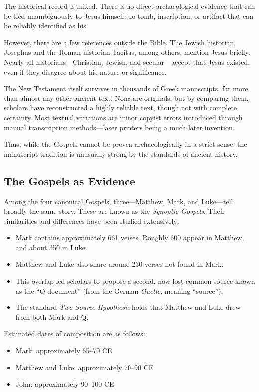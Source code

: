 The historical record is mixed. There is no direct archaeological evidence that can be tied unambiguously to Jesus himself: no tomb, inscription, or artifact that can be reliably identified as his.

However, there are a few references outside the Bible. The Jewish historian Josephus and the Roman historian Tacitus, among others, mention Jesus briefly. Nearly all historians—Christian, Jewish, and secular—accept that Jesus existed, even if they disagree about his nature or significance.

The New Testament itself survives in thousands of Greek manuscripts, far more than almost any other ancient text. None are originals, but by comparing them, scholars have reconstructed a highly reliable text, though not with complete certainty. Most textual variations are minor copyist errors introduced through manual transcription methods—laser printers being a much later invention.

Thus, while the Gospels cannot be proven archaeologically in a strict sense, the manuscript tradition is unusually strong by the standards of ancient history.

\subsection*{The Gospels as Evidence}

Among the four canonical Gospels, three—Matthew, Mark, and Luke—tell broadly the same story. These are known as the \emph{Synoptic Gospels}. Their similarities and differences have been studied extensively:

\begin{itemize}
  \item Mark contains approximately 661 verses. Roughly 600 appear in Matthew, and about 350 in Luke.
  \item Matthew and Luke also share around 230 verses not found in Mark.
  \item This overlap led scholars to propose a second, now-lost common source known as the ``Q document'' (from the German \emph{Quelle}, meaning ``source'').
  \item The standard \emph{Two-Source Hypothesis} holds that Matthew and Luke drew from both Mark and Q.
\end{itemize}

Estimated dates of composition are as follows:
\begin{itemize}
  \item Mark: approximately 65--70 CE
  \item Matthew and Luke: approximately 70--90 CE
  \item John: approximately 90--100 CE
\end{itemize}

